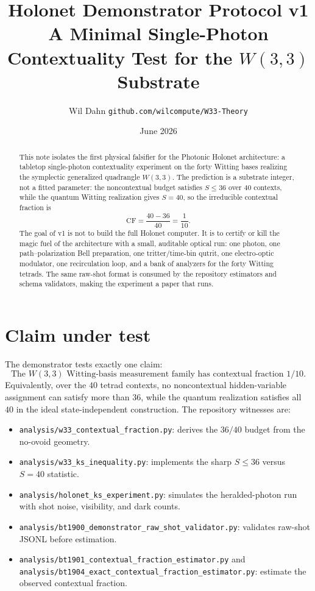 \documentclass[11pt]{article}
\title{\textbf{Holonet Demonstrator Protocol v1}\\[0.3em]
\large A Minimal Single-Photon Contextuality Test for the $W(3,3)$ Substrate}
\author{Wil Dahn \quad\textbar\quad \texttt{github.com/wilcompute/W33-Theory}}
\date{June 2026}
\begin{document}
\maketitle

\begin{abstract}
This note isolates the first physical falsifier for the Photonic Holonet architecture: a tabletop
single-photon contextuality experiment on the forty Witting bases realizing the symplectic generalized
quadrangle $W(3,3)$.  The prediction is a substrate integer, not a fitted parameter: the noncontextual
budget satisfies $S\le 36$ over $40$ contexts, while the quantum Witting realization gives $S=40$, so the
irreducible contextual fraction is
\[
  \mathrm{CF}=\frac{40-36}{40}=\frac{1}{10}.
\]
The goal of v1 is not to build the full Holonet computer.  It is to certify or kill the magic fuel of
the architecture with a small, auditable optical run: one photon, one path--polarization Bell preparation,
one tritter/time-bin qutrit, one electro-optic modulator, one recirculation loop, and a bank of analyzers
for the forty Witting tetrads.  The same raw-shot format is consumed by the repository estimators and
schema validators, making the experiment a paper that runs.
\end{abstract}

\section{Claim under test}
The demonstrator tests exactly one claim:
\[
  \boxed{\text{The }W(3,3)\text{ Witting-basis measurement family has contextual fraction }1/10.}
\]
Equivalently, over the $40$ tetrad contexts, no noncontextual hidden-variable assignment can satisfy more
than $36$, while the quantum realization satisfies all $40$ in the ideal state-independent construction.
The repository witnesses are:
\begin{itemize}[leftmargin=1.4em]
\item \texttt{analysis/w33\_contextual\_fraction.py}: derives the $36/40$ budget from the no-ovoid geometry.
\item \texttt{analysis/w33\_ks\_inequality.py}: implements the sharp $S\le36$ versus $S=40$ statistic.
\item \texttt{analysis/holonet\_ks\_experiment.py}: simulates the heralded-photon run with shot noise, visibility, and dark counts.
\item \texttt{analysis/bt1900\_demonstrator\_raw\_shot\_validator.py}: validates raw-shot JSONL before estimation.
\item \texttt{analysis/bt1901\_contextual\_fraction\_estimator.py} and \texttt{analysis/bt1904\_exact\_contextual\_fraction\_estimator.py}: estimate the observed contextual fraction.
\end{itemize}
\end{document}
